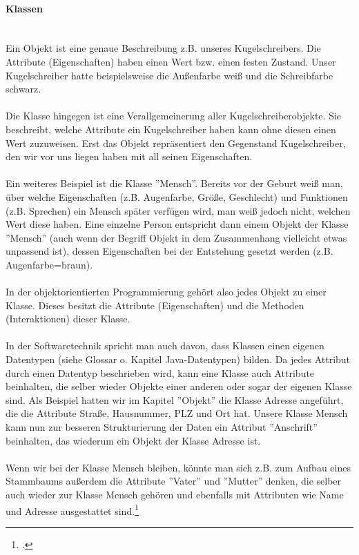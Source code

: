 \paragraph{Klassen}\ \\
Ein Objekt ist eine genaue Beschreibung z.B. unseres Kugelschreibers. Die Attribute (Eigenschaften) haben  einen Wert bzw. einen festen Zustand. Unser Kugelschreiber hatte beispielsweise die Außenfarbe weiß und die Schreibfarbe schwarz.\\
\\
Die Klasse hingegen ist eine Verallgemeinerung aller Kugelschreiberobjekte. Sie beschreibt, welche Attribute ein Kugelschreiber haben kann ohne diesen einen Wert zuzuweisen. Erst das Objekt repräsentiert den Gegenstand Kugelschreiber, den wir vor uns liegen haben mit  all seinen Eigenschaften.\\
\\
Ein weiteres Beispiel ist die Klasse ''Mensch''. Bereits vor der Geburt weiß man, über welche Eigenschaften (z.B. Augenfarbe, Größe, Geschlecht) und Funktionen (z.B. Sprechen) ein Mensch später verfügen wird, man weiß jedoch nicht, welchen Wert diese haben. Eine einzelne Person entspricht dann einem Objekt der Klasse ''Mensch'' (auch wenn der Begriff Objekt in dem Zusammenhang vielleicht etwas unpassend ist), dessen Eigenschaften bei der Entstehung gesetzt werden (z.B. Augenfarbe=braun).\\
\\
In der objektorientierten Programmierung  gehört also jedes Objekt zu einer Klasse. Dieses besitzt die Attribute (Eigenschaften) und die Methoden (Interaktionen) dieser Klasse.\\
\\
In der Softwaretechnik spricht man auch davon, dass Klassen einen eigenen Datentypen (siehe Glossar o. Kapitel Java-Datentypen) bilden. Da jedes Attribut durch einen Datentyp beschrieben wird, kann eine Klasse auch Attribute beinhalten, die selber wieder Objekte einer anderen oder sogar der eigenen Klasse sind. Als Beispiel hatten wir im Kapitel ''Objekt'' die Klasse Adresse angeführt, die die Attribute Straße, Hausnummer, PLZ und Ort hat. Unsere Klasse Mensch kann nun zur besseren Strukturierung der Daten  ein Attribut ''Anschrift'' beinhalten, das wiederum ein Objekt der Klasse Adresse ist.\\
\\
Wenn wir bei der Klasse Mensch bleiben, könnte man sich z.B. zum Aufbau eines Stammbaums außerdem die Attribute ''Vater'' und ''Mutter'' denken, die selber auch wieder zur Klasse Mensch gehören und ebenfalls mit Attributen wie Name und Adresse ausgestattet sind.\footcite{shit_java_tut}
 

